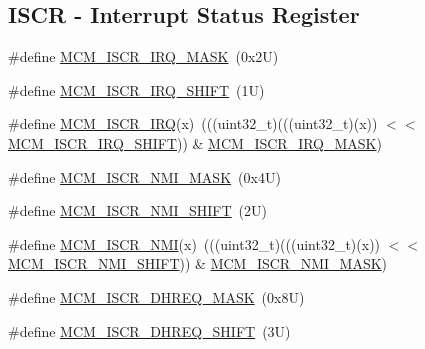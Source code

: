 \subsection*{I\+S\+CR -\/ Interrupt Status Register}
\begin{DoxyCompactItemize}
\item 
\#define \mbox{\hyperlink{group___m_c_m___register___masks_ga86ab0b13f7c720c3b9ad33950745d05d}{M\+C\+M\+\_\+\+I\+S\+C\+R\+\_\+\+I\+R\+Q\+\_\+\+M\+A\+SK}}~(0x2\+U)
\item 
\#define \mbox{\hyperlink{group___m_c_m___register___masks_ga68080cbb94f82b92990da0f06b9e1fe2}{M\+C\+M\+\_\+\+I\+S\+C\+R\+\_\+\+I\+R\+Q\+\_\+\+S\+H\+I\+FT}}~(1\+U)
\item 
\#define \mbox{\hyperlink{group___m_c_m___register___masks_ga8860499432a7e3c401bc721f71bb7fc8}{M\+C\+M\+\_\+\+I\+S\+C\+R\+\_\+\+I\+RQ}}(x)~(((uint32\+\_\+t)(((uint32\+\_\+t)(x)) $<$$<$ \mbox{\hyperlink{group___m_c_m___register___masks_ga68080cbb94f82b92990da0f06b9e1fe2}{M\+C\+M\+\_\+\+I\+S\+C\+R\+\_\+\+I\+R\+Q\+\_\+\+S\+H\+I\+FT}})) \& \mbox{\hyperlink{group___m_c_m___register___masks_ga86ab0b13f7c720c3b9ad33950745d05d}{M\+C\+M\+\_\+\+I\+S\+C\+R\+\_\+\+I\+R\+Q\+\_\+\+M\+A\+SK}})
\item 
\#define \mbox{\hyperlink{group___m_c_m___register___masks_ga5ca1ab81de3e013c750ffb5afc5608d3}{M\+C\+M\+\_\+\+I\+S\+C\+R\+\_\+\+N\+M\+I\+\_\+\+M\+A\+SK}}~(0x4\+U)
\item 
\#define \mbox{\hyperlink{group___m_c_m___register___masks_ga57455aab19203d7226d9077d8be59a56}{M\+C\+M\+\_\+\+I\+S\+C\+R\+\_\+\+N\+M\+I\+\_\+\+S\+H\+I\+FT}}~(2\+U)
\item 
\#define \mbox{\hyperlink{group___m_c_m___register___masks_gab426045982ad3d1f23c6c9dcdf5483ac}{M\+C\+M\+\_\+\+I\+S\+C\+R\+\_\+\+N\+MI}}(x)~(((uint32\+\_\+t)(((uint32\+\_\+t)(x)) $<$$<$ \mbox{\hyperlink{group___m_c_m___register___masks_ga57455aab19203d7226d9077d8be59a56}{M\+C\+M\+\_\+\+I\+S\+C\+R\+\_\+\+N\+M\+I\+\_\+\+S\+H\+I\+FT}})) \& \mbox{\hyperlink{group___m_c_m___register___masks_ga5ca1ab81de3e013c750ffb5afc5608d3}{M\+C\+M\+\_\+\+I\+S\+C\+R\+\_\+\+N\+M\+I\+\_\+\+M\+A\+SK}})
\item 
\#define \mbox{\hyperlink{group___m_c_m___register___masks_ga8c932ffbc33cc5872065ee34f7bd2f0b}{M\+C\+M\+\_\+\+I\+S\+C\+R\+\_\+\+D\+H\+R\+E\+Q\+\_\+\+M\+A\+SK}}~(0x8\+U)
\item 
\#define \mbox{\hyperlink{group___m_c_m___register___masks_gac03fba0494ea82e25a9b865d863f79ea}{M\+C\+M\+\_\+\+I\+S\+C\+R\+\_\+\+D\+H\+R\+E\+Q\+\_\+\+S\+H\+I\+FT}}~(3\+U)

\end{DoxyCompactItemize}
